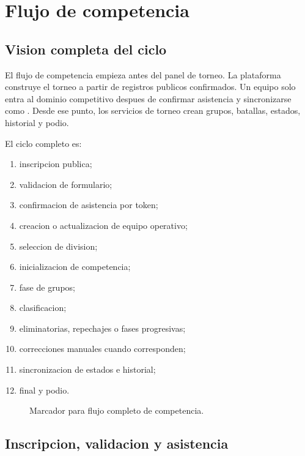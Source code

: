 \chapter{Flujo de competencia}
\label{chap:flujo-competencia}

\section{Vision completa del ciclo}
\label{sec:flujo-vision}

El flujo de competencia empieza antes del panel de torneo. La plataforma construye el torneo a partir de registros publicos confirmados. Un equipo solo entra al dominio competitivo despues de confirmar asistencia y sincronizarse como . Desde ese punto, los servicios de torneo crean grupos, batallas, estados, historial y podio.

El ciclo completo es:

\begin{enumerate}
  \item inscripcion publica;
  \item validacion de formulario;
  \item confirmacion de asistencia por token;
  \item creacion o actualizacion de equipo operativo;
  \item seleccion de division;
  \item inicializacion de competencia;
  \item fase de grupos;
  \item clasificacion;
  \item eliminatorias, repechajes o fases progresivas;
  \item correcciones manuales cuando corresponden;
  \item sincronizacion de estados e historial;
  \item final y podio.
\end{enumerate}

\begin{figure}[H]
  \centering
  \caption{Marcador para flujo completo de competencia.}
  \label{fig:flujo-completo-torneo}
\end{figure}

\section{Inscripcion, validacion y asistencia}
\label{sec:flujo-inscripcion}

